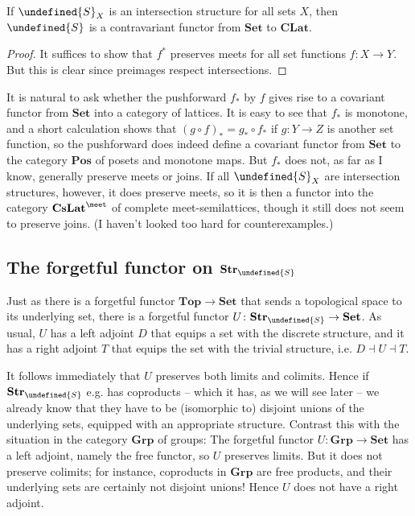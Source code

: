 \documentclass[article, a4paper, 11pt, oneside]{memoir}
\let\mathfrak\undefined
\numberwithin{equation}{chapter}
\newcommand{\strucS}{\mathfrak{S}}
\newcommand{\ncat}[1]{\mathbf{#1}} %
\newcommand{\catSet}{\ncat{Set}} %
\newcommand{\catGrp}{\ncat{Grp}} %
\newcommand{\catTop}{\ncat{Top}} %
\newcommand{\catPos}{\ncat{Pos}} %
\newcommand{\catCLat}{\ncat{CLat}} %
\newcommand{\catCMeetLat}{\ncat{CsLat}^{\meet}} %
\newcommand{\catStruc}[1]{\ncat{Str}_{#1}} %
\newcommand{\catStrucS}{\catStruc{\strucS}} %
\begin{document}
\begin{proposition}[Functoriality of $\strucS$, II]
    If $\strucS_X$ is an intersection structure for all sets $X$, then $\strucS$ is a contravariant functor from $\catSet$ to $\catCLat$.
\end{proposition}

\begin{proof}
    It suffices to show that $f^*$ preserves meets for all set functions $f \colon X \to Y$. But this is clear since preimages respect intersections.
\end{proof}

It is natural to ask whether the pushforward $f_*$ by $f$ gives rise to a covariant functor from $\catSet$ into a category of lattices. It is easy to see that $f_*$ is monotone, and a short calculation shows that $(g \circ f)_* = g_* \circ f_*$ if $g \colon Y \to Z$ is another set function, so the pushforward does indeed define a covariant functor from $\catSet$ to the category $\catPos$ of posets and monotone maps. But $f_*$ does not, as far as I know, generally preserve meets or joins. If all $\strucS_X$ are intersection structures, however, it does preserve meets, so it is then a functor into the category $\catCMeetLat$ of complete meet-semilattices, though it still does not seem to preserve joins. (I haven't looked too hard for counterexamples.)


\subsection{The forgetful functor on $\catStrucS$}

Just as there is a forgetful functor $\catTop \to \catSet$ that sends a topological space to its underlying set, there is a forgetful functor $U \colon \catStrucS \to \catSet$. As usual, $U$ has a left adjoint $D$ that equips a set with the discrete structure, and it has a right adjoint $T$ that equips the set with the trivial structure, i.e. $D \dashv U \dashv T$.

It follows immediately that $U$ preserves both limits and colimits. Hence if $\catStrucS$ e.g. has coproducts -- which it has, as we will see later -- we already know that they have to be (isomorphic to) disjoint unions of the underlying sets, equipped with an appropriate structure. Contrast this with the situation in the category $\catGrp$ of groups: The forgetful functor $U \colon \catGrp \to \catSet$ has a left adjoint, namely the free functor, so $U$ preserves limits. But it does not preserve colimits; for instance, coproducts in $\catGrp$ are free products, and their underlying sets are certainly not disjoint unions! Hence $U$ does not have a right adjoint.
\end{document}
